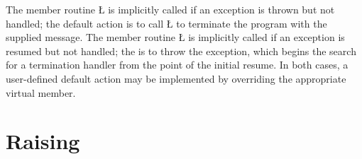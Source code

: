 \documentclass[openright,twoside]{report}
\begin{document}
The member routine \LGinlinetrue\LGbegin\lgrinde\L{}\endlgrinde\LGend{} is implicitly called if an exception is thrown but not handled;
the default action is to call \LGinlinetrue\LGbegin\lgrinde\L{}\endlgrinde\LGend{} to terminate the program with the supplied message.
The member routine \LGinlinetrue\LGbegin\lgrinde\L{}\endlgrinde\LGend{} is implicitly called if an exception is resumed but not handled;
the  is to throw the exception, which begins the search for a termination handler from the point of the initial resume.
In both cases, a user-defined default action may be implemented by overriding the appropriate virtual member.


\section{Raising}
\label{s:Raising}
\end{document}
